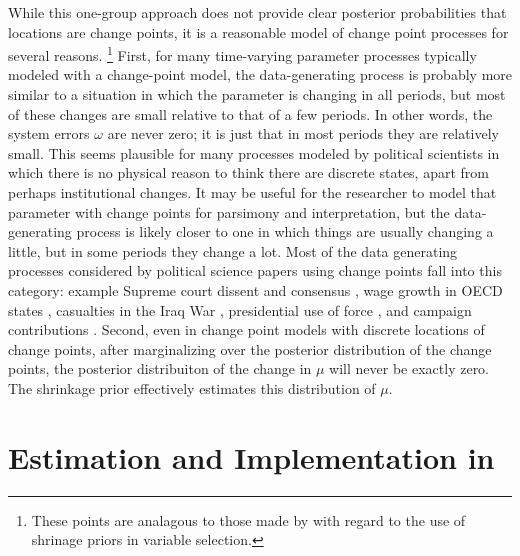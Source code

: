 While this one-group approach does not provide clear posterior probabilities that locations are change points, it is a reasonable model of change point processes for several reasons.%
\footnote{These points are analagous to those made by \textcite[2-3]{PolsonScott2012} with regard to the use of shrinage priors in variable selection.}
First, for many time-varying parameter processes typically modeled with a change-point model, the data-generating process is probably more similar to a situation in which the parameter is changing in all periods, but most of these changes are small relative to that of a few periods.
In other words, the system errors $\omega$ are never zero; it is just that in most periods they are relatively small.
This seems plausible for many processes modeled by political scientists in which there is no physical reason to think there are discrete states, apart from perhaps institutional changes.
It may be useful for the researcher to model that parameter with change points for parsimony and interpretation, but the data-generating process is likely closer to one in which things are usually changing a little, but in some periods they change a lot. 
Most of the data generating processes considered by political science papers using change points fall into this category: example Supreme court dissent and consensus \parencite{CalderiaZorn1998}, wage growth in OECD states \parencite{WesternKleykamp2004}, casualties in the Iraq War \parencite{Spirling2007a}, presidential use of force \parencite{Park2010}, and campaign contributions \parencite{Blackwell2012}.
Second, even in change point models with discrete locations of change points, after marginalizing over the posterior distribution of the change points, the posterior distribuiton of the change in $\mu$ will never be exactly zero.
The shrinkage prior effectively estimates this distribution of $\mu$.



\section{Estimation and Implementation in \Stan{}}
\label{dlm:sec:estimation}


